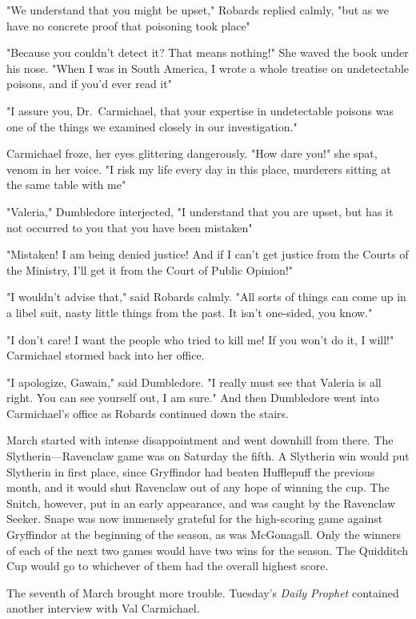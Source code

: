 "We understand that you might be upset," Robards replied calmly, "but as we have no concrete proof that poisoning took place{\el}"

"Because you couldn't detect it? That means nothing!" She waved the book under his nose. "When I was in South America, I wrote a whole treatise on undetectable poisons, and if you'd ever read it{\el}"

"I assure you, Dr.~Carmichael, that your expertise in undetectable poisons was one of the things we examined closely in our investigation."

Carmichael froze, her eyes glittering dangerously. "How dare you!" she spat, venom in her voice. "I risk my life every day in this place, murderers sitting at the same table with me{\el}"

"Valeria," Dumbledore interjected, "I understand that you are upset, but has it not occurred to you that you have been mistaken{\el}"

"Mistaken! I am being denied justice! And if I can't get justice from the Courts of the Ministry, I'll get it from the Court of Public Opinion!"

"I wouldn't advise that," said Robards calmly. "All sorts of things can come up in a libel suit, nasty little things from the past. It isn't one-sided, you know."

"I don't care! I want the people who tried to kill me! If you won't do it, I will!" Carmichael stormed back into her office.

"I apologize, Gawain," said Dumbledore. "I really must see that Valeria is all right. You can see yourself out, I am sure." And then Dumbledore went into Carmichael's office as Robards continued down the stairs.

March started with intense disappointment and went downhill from there. The Slytherin—Ravenclaw game was on Saturday the fifth. A Slytherin win would put Slytherin in first place, since Gryffindor had beaten Hufflepuff the previous month, and it would shut Ravenclaw out of any hope of winning the cup. The Snitch, however, put in an early appearance, and was caught by the Ravenclaw Seeker. Snape was now immensely grateful for the high-scoring game against Gryffindor at the beginning of the season, as was McGonagall. Only the winners of each of the next two games would have two wins for the season. The Quidditch Cup would go to whichever of them had the overall highest score.

The seventh of March brought more trouble. Tuesday's \emph{Daily Prophet} contained another interview with Val Carmichael.

